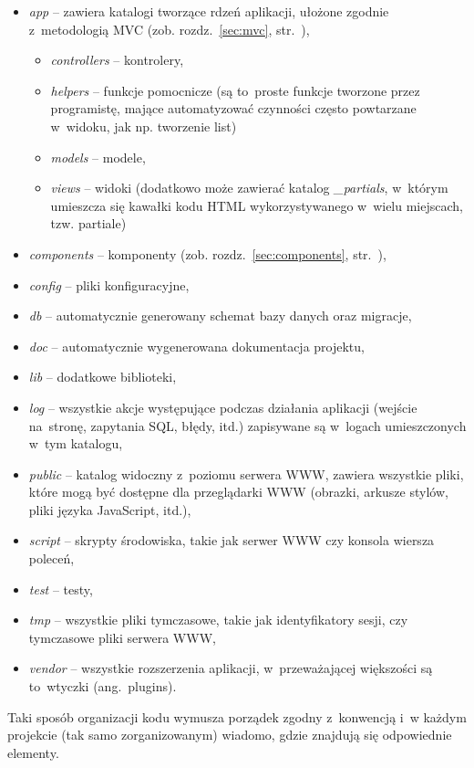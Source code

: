 \documentclass[a4paper,12pt,oneside]{report}
\begin{document}
\begin{itemize}
  \item \emph{app} -- zawiera katalogi tworzące rdzeń aplikacji, ułożone zgodnie z~metodologią MVC (zob. rozdz.~\ref{sec:mvc}, str.~\pageref{sec:mvc}),
  \begin{itemize}
    \item \emph{controllers} -- kontrolery,
    \item \emph{helpers} -- funkcje pomocnicze (są to~proste funkcje tworzone przez programistę, mające automatyzować czynności często powtarzane w~widoku, jak np. tworzenie list)
    \item \emph{models} -- modele,
    \item \emph{views} -- widoki (dodatkowo może zawierać katalog \emph{\_partials}, w~którym umieszcza się kawałki kodu HTML wykorzystywanego w~wielu miejscach, tzw. partiale)
  \end{itemize}
  \item \emph{components} -- komponenty (zob. rozdz.~\ref{sec:components}, str.~\pageref{sec:components}),
  \item \emph{config} -- pliki konfiguracyjne,
  \item \emph{db} -- automatycznie generowany schemat bazy danych oraz migracje,
  \item \emph{doc} -- automatycznie wygenerowana dokumentacja projektu,
  \item \emph{lib} -- dodatkowe biblioteki,
  \item \emph{log} -- wszystkie akcje występujące podczas działania aplikacji (wejście na~stronę, zapytania SQL, błędy, itd.) zapisywane są w~logach umieszczonych w~tym katalogu,
  \item \emph{public} -- katalog widoczny z~poziomu serwera WWW, zawiera wszystkie pliki, które mogą być dostępne dla przeglądarki WWW (obrazki, arkusze stylów, pliki języka JavaScript, itd.),
  \item \emph{script} -- skrypty środowiska, takie jak serwer WWW czy konsola wiersza poleceń,
  \item \emph{test} -- testy,
  \item \emph{tmp} -- wszystkie pliki tymczasowe, takie jak identyfikatory sesji, czy tymczasowe pliki serwera WWW,
  \item \emph{vendor} -- wszystkie rozszerzenia aplikacji, w~przeważającej większości są to~wtyczki (ang.~plugins).
\end{itemize}

Taki sposób organizacji kodu wymusza porządek zgodny z~konwencją i~w każdym projekcie (tak samo zorganizowanym) wiadomo, gdzie znajdują się odpowiednie elementy.
\end{document}
